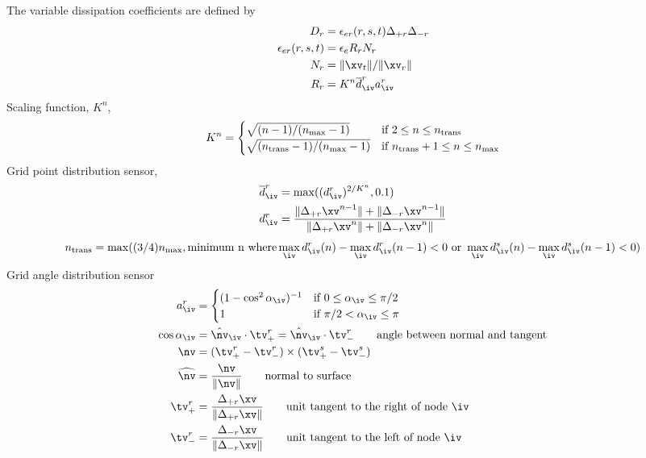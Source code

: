 The variable dissipation coefficients are defined by
\begin{align*}
  D_r  &= \epsilon_{er}(r,s,t) \Delta_{+r}\Delta_{-r} \\
 \epsilon_{er}(r,s,t) &= \epsilon_e R_r N_r \\
 N_r &= \| \xv_t \| / \| \xv_r \| \\
 R_r &= K^n {\overline d}^r_\iv a^r_\iv \\
\end{align*}
Scaling function, $K^n$,
\[
   K^n =  \begin{cases}
              \sqrt{ (n-1)/(n_{\rm{max}}-1) } & \text{if $2\le n \le n_{\rm{trans}}$} \\
              \sqrt{ (n_{\rm{trans}}-1)/(n_{\rm{max}}-1) } & \text{if $n_{\rm{trans}}+1 \le n \le n_{\rm{max}}$} \\
          \end{cases}
\]
Grid point distribution sensor,
\begin{align*}
  {\overline d}^r_\iv &= \max( (d^r_\iv)^{2/K^n}, 0.1) \\
  d^r_\iv &= {{ \| \Delta_{+r}\xv^{n-1}\| + \| \Delta_{-r}\xv^{n-1}\| } \over
            { \| \Delta_{+r}\xv^{n  }\| + \| \Delta_{-r}\xv^{n  }\| } }
\end{align*}
\[
n_{\rm{trans}} = \max( (3/4)n_{\rm{max}} , \mbox{minimum n where}  \max_\iv d^r_\iv(n) - \max_\iv d^r_\iv(n-1) < 0 \mbox{~or~}
                              \max_\iv d^s_\iv(n) - \max_\iv d^s_\iv(n-1) <0  )
\]
Grid angle distribution sensor
\begin{align*}
a^r_\iv &= \begin{cases}
              (1 - \cos^2 \alpha_\iv ) ^{-1} & \text{if $0\le \alpha_\iv \le \pi/2$} \\
              1                              & \text{if $\pi/2 < \alpha_\iv \le \pi$}
           \end{cases} \\
  \cos \alpha_\iv & = {\hat \nv}_\iv \cdot \tv_+^r  = {\hat \nv}_\iv \cdot \tv_-^r \qquad \mbox{angle between normal and tangent}\\
   \nv &= (\tv_+^r - \tv_-^r) \times (\tv_+^s - \tv_-^s) \\
   \widehat{\nv} & = {\nv \over \| \nv \| } \qquad\mbox{normal to surface}\\
  \tv_+^r & = { \Delta_{+r}\xv \over \| \Delta_{+r}\xv \| } \qquad\mbox{unit tangent to the right of node $\iv$} \\
  \tv_-^r & = { \Delta_{-r}\xv \over \| \Delta_{-r}\xv \| } \qquad\mbox{unit tangent to the left of node $\iv$} \\
\end{align*}


